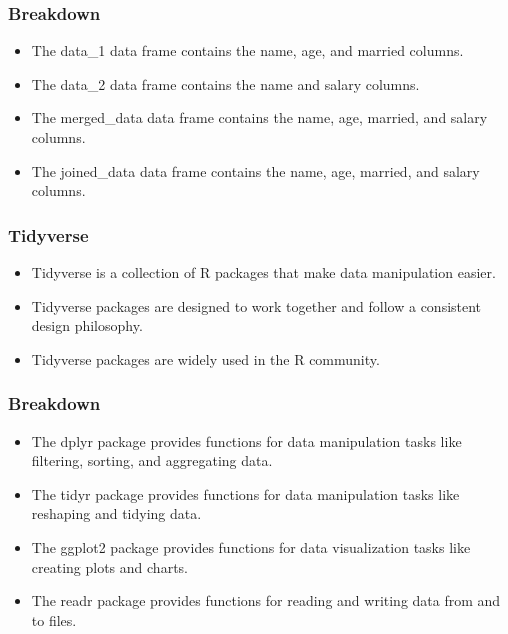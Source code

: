 \documentclass[serif, 9pt, aspectratio=32]{beamer}
\begin{document}
\begin{frame}
    \centering
    \frametitle{Breakdown}
    \begin{itemize}
        \setlength{\itemsep}{2em}
        \item The data\_1 data frame contains the name, age, and married columns.
        \item The data\_2 data frame contains the name and salary columns.
        \item The merged\_data data frame contains the name, age, married, and salary columns.
        \item The joined\_data data frame contains the name, age, married, and salary columns.
    \end{itemize}
\end{frame}

\begin{frame}
    \centering
    \frametitle{Tidyverse}
    \begin{itemize}
        \setlength{\itemsep}{2em}
        \item Tidyverse is a collection of R packages that make data manipulation easier.
        \item Tidyverse packages are designed to work together and follow a consistent design philosophy.
        \item Tidyverse packages are widely used in the R community.
    \end{itemize}
\end{frame}

\begin{frame}
    \centering
    \frametitle{Breakdown}
    \begin{itemize}
        \setlength{\itemsep}{2em}
        \item The dplyr package provides functions for data manipulation tasks like filtering, sorting, and aggregating data.
        \item The tidyr package provides functions for data manipulation tasks like reshaping and tidying data.
        \item The ggplot2 package provides functions for data visualization tasks like creating plots and charts.
        \item The readr package provides functions for reading and writing data from and to files.
    \end{itemize}
\end{frame}
\end{document}
